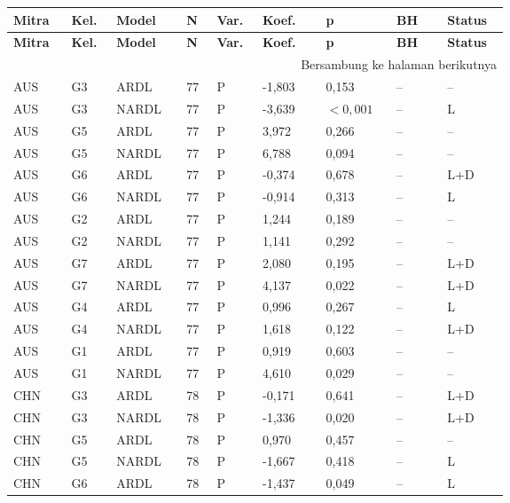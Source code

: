 {\footnotesize\setlength{\tabcolsep}{3pt}\renewcommand{\arraystretch}{1.15}
\begin{longtable}{p{0.075\linewidth}p{0.05\linewidth}p{0.09\linewidth}p{0.04\linewidth}p{0.05\linewidth}p{0.1\linewidth}p{0.085\linewidth}p{0.085\linewidth}p{0.075\linewidth}}
\toprule
\textbf{Mitra} & \textbf{Kel.} & \textbf{Model} & \textbf{N} & \textbf{Var.} & \textbf{Koef.} & \textbf{p} & \textbf{BH} & \textbf{Status}\\
\midrule
\endfirsthead
\toprule
\textbf{Mitra} & \textbf{Kel.} & \textbf{Model} & \textbf{N} & \textbf{Var.} & \textbf{Koef.} & \textbf{p} & \textbf{BH} & \textbf{Status}\\
\midrule
\endhead
\midrule\multicolumn{9}{r}{\footnotesize Bersambung ke halaman berikutnya}\\\endfoot
\bottomrule\endlastfoot
AUS & G3 & ARDL & 77 & P & -1,803 & 0,153 & -- & --\\
AUS & G3 & NARDL & 77 & P & -3,639 & \(<0{,}001\) & -- & L\\
AUS & G5 & ARDL & 77 & P & 3,972 & 0,266 & -- & --\\
AUS & G5 & NARDL & 77 & P & 6,788 & 0,094 & -- & --\\
AUS & G6 & ARDL & 77 & P & -0,374 & 0,678 & -- & L+D\\
AUS & G6 & NARDL & 77 & P & -0,914 & 0,313 & -- & L\\
AUS & G2 & ARDL & 77 & P & 1,244 & 0,189 & -- & --\\
AUS & G2 & NARDL & 77 & P & 1,141 & 0,292 & -- & --\\
AUS & G7 & ARDL & 77 & P & 2,080 & 0,195 & -- & L+D\\
AUS & G7 & NARDL & 77 & P & 4,137 & 0,022 & -- & L+D\\
AUS & G4 & ARDL & 77 & P & 0,996 & 0,267 & -- & L\\
AUS & G4 & NARDL & 77 & P & 1,618 & 0,122 & -- & L+D\\
AUS & G1 & ARDL & 77 & P & 0,919 & 0,603 & -- & --\\
AUS & G1 & NARDL & 77 & P & 4,610 & 0,029 & -- & --\\
CHN & G3 & ARDL & 78 & P & -0,171 & 0,641 & -- & L+D\\
CHN & G3 & NARDL & 78 & P & -1,336 & 0,020 & -- & L+D\\
CHN & G5 & ARDL & 78 & P & 0,970 & 0,457 & -- & --\\
CHN & G5 & NARDL & 78 & P & -1,667 & 0,418 & -- & L\\
CHN & G6 & ARDL & 78 & P & -1,437 & 0,049 & -- & L\\

\end{longtable}}
